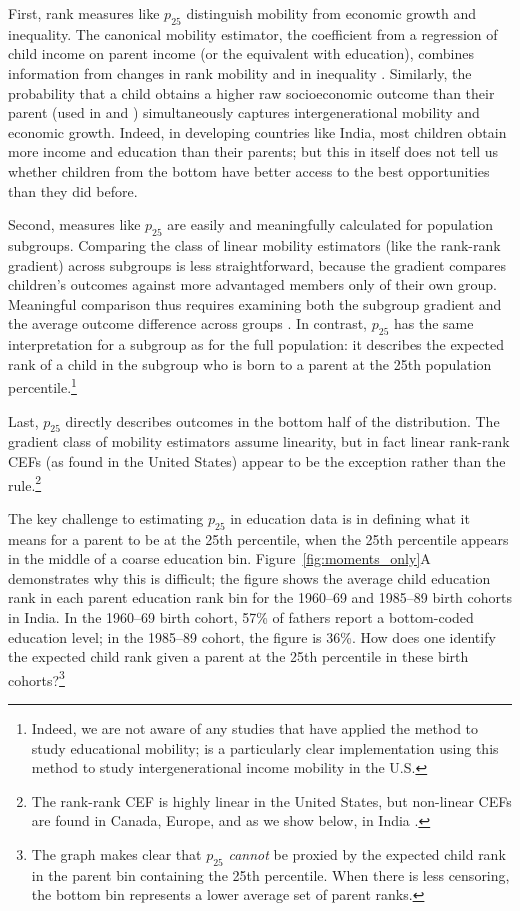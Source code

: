 \documentclass[12pt,letterpaper]{article}
\numberwithin{equation}{section}
\begin{document}
First, rank measures like $p_{25}$ distinguish mobility from economic growth and inequality. The canonical mobility estimator, the coefficient from a regression of child income on parent income (or the equivalent with education), combines information from changes in rank mobility and in inequality \cite{chetty2014b}. Similarly, the probability that a child obtains a higher raw socioeconomic outcome than their parent (used in  and ) simultaneously captures intergenerational mobility and economic growth. Indeed, in developing countries like India, most children obtain more income and education than their parents; but this in itself does not tell us whether children from the bottom have better access to the best opportunities than they did before.


Second, measures like $p_{25}$ are easily and meaningfully calculated for population subgroups. Comparing the class of linear mobility estimators (like the rank-rank gradient) across subgroups is less straightforward, because the gradient compares children's outcomes against more advantaged members only of their own group. Meaningful comparison thus requires examining both the subgroup gradient and the average outcome difference across groups \cite{hertz2008a,jacome2021}. In contrast, $p_{25}$ has the same interpretation for a subgroup as for the full population: it describes the expected rank of a child in the subgroup who is born to a parent at the 25th population percentile.\footnote{Indeed, we are not aware of any studies that have applied the  method to study educational mobility;  is a particularly clear implementation using this method to study intergenerational income mobility in the U.S.} 

Last, $p_{25}$ directly describes outcomes in the bottom half of the distribution. The gradient class of mobility estimators assume linearity, but in fact linear rank-rank CEFs (as found in the United States) appear to be the exception rather than the rule.\footnote{The rank-rank CEF is highly linear in the United States, but non-linear CEFs are found in Canada, Europe, and as we show below, in India \cite{bratsberg2007,boserup2014,bratberg2017,connolly2019}.} 

The key challenge to estimating $p_{25}$ in education data is in defining what it means for a parent to be at the 25th percentile, when the 25th percentile appears in the middle of a coarse education bin. Figure~\ref{fig:moments_only}A demonstrates why this is difficult; the figure shows the average child education rank in each parent education rank bin for the 1960--69 and 1985--89 birth cohorts in India. In the 1960--69 birth cohort, 57\% of fathers report a bottom-coded education level; in the 1985--89 cohort, the figure is 36\%. How does one identify the expected child rank given a parent at the 25th percentile in these birth cohorts?\footnote{The graph makes clear that $p_{25}$ \textit{cannot} be proxied by the expected child rank in the parent bin containing the 25th percentile. When there is less censoring, the bottom bin represents a lower average set of parent ranks.}
\end{document}
